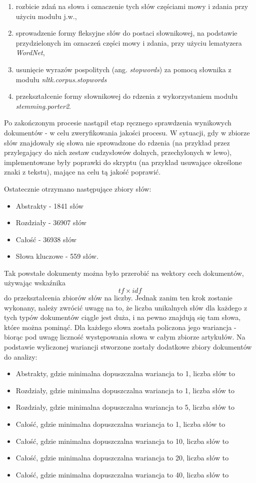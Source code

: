 \documentclass{article}
\begin{document}
\begin{enumerate}
\begin{enumerate}
		\item rozbicie zdań na słowa i oznaczenie tych słów częściami mowy i zdania przy użyciu modułu j.w.,
		\item sprowadzenie formy fleksyjne słów do postaci słownikowej, na podstawie przydzielonych im oznaczeń części mowy i zdania, przy użyciu lematyzera \textit{WordNet},
		\item usunięcie wyrazów pospolitych (ang. \textit{stopwords}) za pomocą słownika z modułu \textit{nltk.corpus.stopwords}
		\item przekształcenie formy słownikowej do rdzenia z wykorzystaniem modułu \textit{stemming.porter2}.
	\end{enumerate}
\end{enumerate}

Po zakończonym procesie nastąpił etap ręcznego sprawdzenia wynikowych dokumentów - w celu zweryfikowania jakości procesu. W sytuacji, gdy w zbiorze słów znajdowały się słowa nie sprowadzone do rdzenia (na przykład przez przylegający do nich zestaw cudzysłowów dolnych, przechylonych w lewo), implementowane były poprawki do skryptu (na przykład usuwające określone znaki z tekstu), mające na celu tą jakość poprawić. 

Ostatecznie otrzymano następujące zbiory słów:
\begin{itemize}
	\item Abstrakty - 1841 słów
	\item Rozdziały - 36907 słów
	\item Całość - 36938 słów
	\item Słowa kluczowe - 559 słów.
\end{itemize} 
Tak powstałe dokumenty można było przerobić na wektory cech dokumentów, używając wskaźnika \[tf \times idf \] do przekształcenia zbiorów słów na liczby.
Jednak zanim ten krok zostanie wykonany, należy zwrócić uwagę na to, że liczba unikalnych słów dla każdego z tych typów dokumentów ciągle jest duża, i na pewno znajdują się tam słowa, które można pominąć. 
Dla każdego słowa została policzona jego wariancja - biorąc pod uwagę liczność występowania słowa w całym zbiorze artykułów. Na podstawie wyliczonej wariancji stworzone zostały dodatkowe zbiory dokumentów do analizy:
\begin{itemize}
	\item Abstrakty, gdzie minimalna dopuszczalna wariancja to 1, liczba słów to
	\item Rozdziały, gdzie minimalna dopuszczalna wariancja to 1, liczba słów to
	\item Rozdziały, gdzie minimalna dopuszczalna wariancja to 5, liczba słów to
	\item Całość, gdzie minimalna dopuszczalna wariancja to 1, liczba słów to
	\item Całość, gdzie minimalna dopuszczalna wariancja to 10, liczba słów to
	\item Całość, gdzie minimalna dopuszczalna wariancja to 20, liczba słów to
	\item Całość, gdzie minimalna dopuszczalna wariancja to 40, liczba słów to
\end{itemize}
\end{document}
